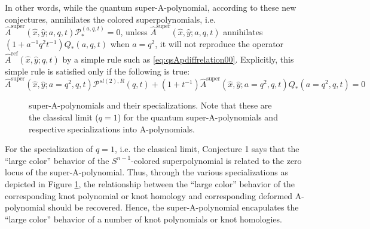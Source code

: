 \documentclass[a4paper,titlepage,twoside]{book}
\begin{document}
In other words, while the quantum super-A-polynomial, according to these new conjectures, annihilates the colored superpolynomials, i.e.  $\widehat{A}^{\text{super}}{ (\widehat{x}, \widehat{y}; a,q,t)} \mathcal{P}_*^{(a,q,t)} = 0$, unless $\widehat{A}^{\text{super}}{ (\widehat{x}, \widehat{y};a,q,t )}$ annihilates $(1+a^{-1}q^2 t^{-1})Q_*{(a,q,t)}$ when $a=q^2$, it will not reproduce the operator $\widehat{A}^{\text{ref}}{ (\widehat{x}, \widehat{y}; q,t )}$ by a simple rule such as \eqref{eq:qsApdiffrelation00}.  Explicitly, this simple rule is satisfied only if the following is true:
\begin{equation}
  \widehat{A}^{\text{super}}{ (\widehat{x},\widehat{y};a=q^2, q, t)} \mathcal{P}^{ sl{(2)},R}{ (q,t)} + (1+ t^{-1} ) \widehat{A}^{\text{super}}{ (\widehat{x}, \widehat{y}; a=q^2, q,t) } Q_*(a=q^2, q,t) = 0
\end{equation}


\begin{figure}[h]
\begin{center}
\end{center}
\caption{ super-A-polynomials and their specializations.  Note that these are the classical limit ($q=1$) for the quantum super-A-polynomials and respective specializations into A-polynomials.} \label{Fig:superApolyspecializations}
\end{figure}

For the specialization of $q=1$, i.e. the classical limit, Conjecture 1 says that the ``large color'' behavior of the $S^{n-1}$-colored superpolynomial is related to the zero locus of the super-A-polynomial.  Thus, through the various specializations as depicted in Figure \ref{Fig:superApolyspecializations}, the relationship between the ``large color'' behavior of the corresponding knot polynomial or knot homology and corresponding deformed A-polynomial should be recovered.  Hence, the super-A-polynomial encapulates the ``large color'' behavior of a number of knot polynomials or knot homologies.  
\end{document}
